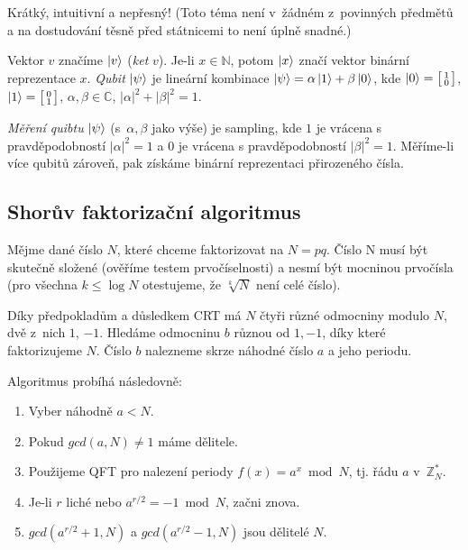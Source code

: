 Krátký, intuitivní a nepřesný! (Toto téma není v~žádném z~povinných
předmětů a na dostudování těsně před státnicemi to není úplně snadné.)

Vektor $v$ značíme $\ket{v}$ ({\em ket}
$v$). Je-li $x \in \mathbb{N}$, potom $\ket{x}$ značí vektor binární
reprezentace $x$. {\em Qubit} $\ket{\psi}$ je lineární kombinace
$\ket{\psi} = \alpha \ket{1} + \beta \ket{0}$, kde $\ket{0} =
\bigl[\begin{smallmatrix}
1\\
0
\end{smallmatrix}\bigr]$, $\ket{1} = \bigl[\begin{smallmatrix}
0\\
1
\end{smallmatrix}\bigr]$, $\alpha, \beta \in \mathbb{C}$,
$\lvert \alpha \rvert^2 + \lvert \beta \rvert^2 = 1$.

{\em Měření quibtu} $\ket{\psi}$ (s~$\alpha, \beta$ jako výše) je sampling,
kde $1$ je vrácena s pravděpodobností
$\lvert \alpha \rvert^2 = 1$
a $0$ je vrácena s pravděpodobností
$\lvert \beta \rvert^2 = 1$. Měříme-li více qubitů zároveň, pak získáme
binární reprezentaci přirozeného čísla.

\subsection{Shorův faktorizační algoritmus}

Mějme dané číslo $N$, které chceme faktorizovat na $N = pq$.
Číslo N musí být skutečně složené (ověříme testem prvočíselnosti)
a nesmí být mocninou prvočísla (pro všechna $k \leq \log N$ otestujeme,
že $\sqrt[k]{N}$ není celé číslo).

Díky předpokladům a důsledkem CRT má $N$ čtyři různé odmocniny modulo
$N$, dvě z~nich $1$, $-1$. Hledáme odmocninu $b$ různou od $1,-1$, díky
které faktorizujeme $N$. Číslo $b$ nalezneme skrze náhodné číslo $a$
a jeho periodu.

Algoritmus probíhá následovně:

\begin{enumerate}
    \item Vyber náhodně $a < N$.
    \item Pokud $gcd(a, N) \neq 1$ máme dělitele.
    \item Použijeme QFT pro nalezení periody $f(x) = a^x \bmod N$,
        tj. řádu $a$ v~$\mathbb{Z}_N^*$.
    \item Je-li $r$ liché nebo $a^{r/2} = -1 \bmod N$, začni znova.
    \item $gcd(a^{r/2} + 1, N)$ a $gcd(a^{r/2} - 1, N)$ jsou dělitelé $N$.
\end{enumerate}

